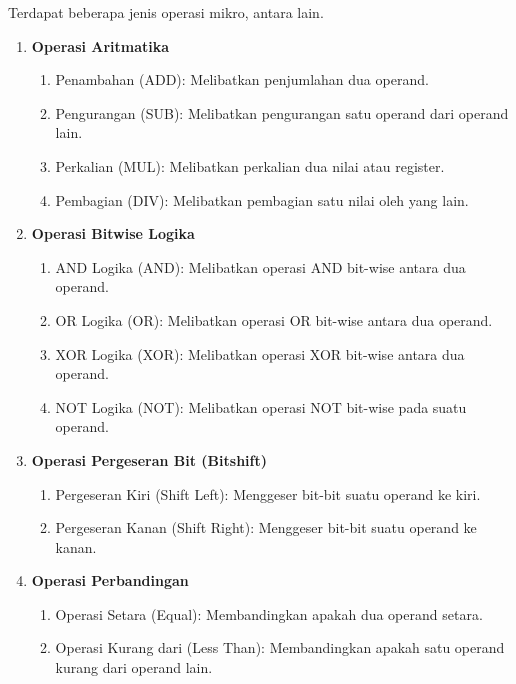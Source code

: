 Terdapat beberapa jenis operasi mikro, antara lain.

\begin{enumerate}[label=\alph*]

  \item \textbf{Operasi Aritmatika}
    \begin{enumerate}[label=\roman*.]
      \item Penambahan (ADD): Melibatkan penjumlahan dua operand.
      \item Pengurangan (SUB): Melibatkan pengurangan satu operand dari operand lain.
      \item Perkalian (MUL): Melibatkan perkalian dua nilai atau register.
      \item Pembagian (DIV): Melibatkan pembagian satu nilai oleh yang lain.
    \end{enumerate}

  \item \textbf{Operasi Bitwise Logika}
    \begin{enumerate}[label=\roman*.]
      \item AND Logika (AND): Melibatkan operasi AND bit-wise antara dua operand.
      \item OR Logika (OR): Melibatkan operasi OR bit-wise antara dua operand.
      \item XOR Logika (XOR): Melibatkan operasi XOR bit-wise antara dua operand.
      \item NOT Logika (NOT): Melibatkan operasi NOT bit-wise pada suatu operand.
    \end{enumerate}

  \item \textbf{Operasi Pergeseran Bit (Bitshift)}
    \begin{enumerate}[label=\roman*.]
      \item Pergeseran Kiri (Shift Left): Menggeser bit-bit suatu operand ke kiri.
      \item Pergeseran Kanan (Shift Right): Menggeser bit-bit suatu operand ke kanan.
    \end{enumerate}

  \item \textbf{Operasi Perbandingan}
    \begin{enumerate}[label=\roman*.]
      \item Operasi Setara (Equal): Membandingkan apakah dua operand setara.
      \item Operasi Kurang dari (Less Than): Membandingkan apakah satu operand kurang dari operand lain.
    \end{enumerate}


\end{enumerate}
